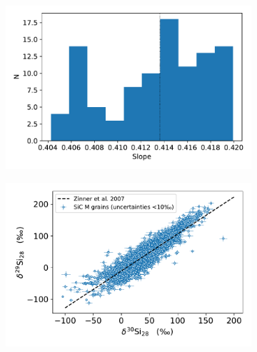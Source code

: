 \documentclass{brandeis-thesis3.2}
\begin{document}
\begin{figure}[H]
\begin{subfigure}[c]{0.49\textwidth}
    \end{subfigure}
    \centering
    \begin{subfigure}[c]{0.49\textwidth}
        \includegraphics[width=\textwidth]{figs/slope.pdf}
    \end{subfigure}
    \begin{subfigure}[c]{0.49\textwidth}
        \includegraphics[width=\textwidth]{figs/stardust.pdf}
    \end{subfigure}

\end{figure}
\end{document}
